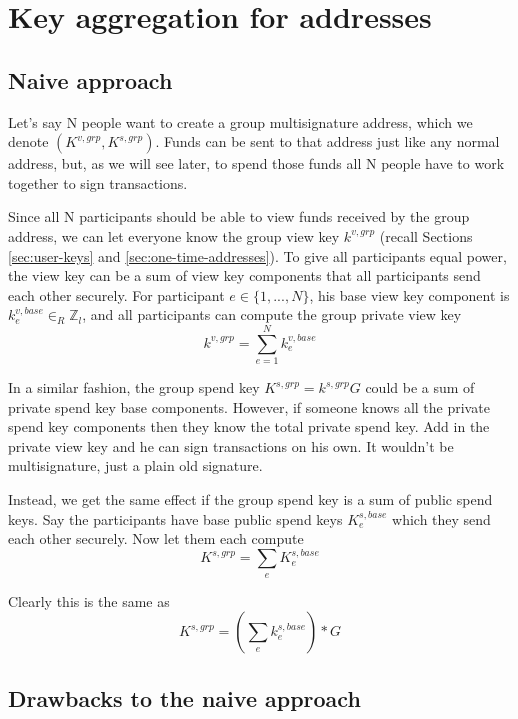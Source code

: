 \section{Key aggregation for addresses}
\label{sec:key-aggregation}

\subsection{Naive approach}
\label{sec:naive-key-aggregation}

Let's say N people want to create a group multisignature address, which we denote $(K^{v,grp},K^{s,grp})$. Funds can be sent to that address just like any normal address, but, as we will see later, to spend those funds all N people have to work together to sign transactions.

Since all N participants should be able to view funds received by the group address, we can let everyone know the group view key $k^{v,grp}$ (recall Sections \ref{sec:user-keys} and \ref{sec:one-time-addresses}). To give all participants equal power, the view key can be a sum of view key components that all participants send each other securely. For participant $e \in \{1,...,N\}$, his base view key component is $k^{v,base}_e \in_R \mathbb{Z}_l$, and all participants can compute the group private view key
\[k^{v,grp} = \sum^{N}_{e=1} k^{v,base}_e\]

In a similar fashion, the group spend key $K^{s,grp} = k^{s,grp} G$ could be a sum of private spend key base components. However, if someone knows all the private spend key components then they know the total private spend key. Add in the private view key and he can sign transactions on his own. It wouldn't be multisignature, just a plain old signature.

Instead, we get the same effect if the group spend key is a sum of public spend keys. Say the participants have base public spend keys $K^{s,base}_e$ which they send each other securely. Now let them each compute
\[K^{s,grp} = \sum_e K^{s,base}_e\]

Clearly this is the same as
\[K^{s,grp} = (\sum_e k^{s,base}_e)*G\]


\subsection{Drawbacks to the naive approach}
\label{subsec:drawbacks-naive-aggregation-cancellation}

